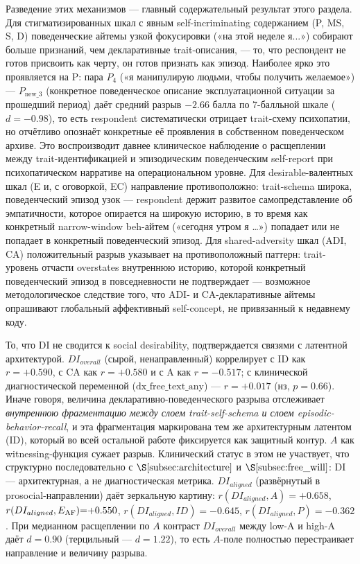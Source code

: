 Разведение этих механизмов --- главный содержательный результат этого раздела. Для стигматизированных шкал с явным self-incriminating содержанием (P, MS, S, D) поведенческие айтемы узкой фокусировки («на этой неделе я...») собирают больше признаний, чем декларативные trait-описания, --- то, что респондент не готов присвоить как черту, он готов признать как эпизод. Наиболее ярко это проявляется на P: пара $P_4$ («я манипулирую людьми, чтобы получить желаемое») --- $P_{\text{new\_3}}$ (конкретное поведенческое описание эксплуатационной ситуации за прошедший период) даёт средний разрыв $-2.66$ балла по 7-балльной шкале ($d{=}{-}0.98$), то есть respondent систематически отрицает trait-схему психопатии, но отчётливо опознаёт конкретные её проявления в собственном поведенческом архиве. Это воспроизводит давнее клиническое наблюдение о расщеплении между trait-идентификацией и эпизодическим поведенческим self-report при психопатическом нарративе \citep{hare2003, lilienfeld1990} на операциональном уровне. Для desirable-валентных шкал (E и, с оговоркой, EC) направление противоположно: trait-schema широка, поведенческий эпизод узок --- respondent держит развитое самопредставление об эмпатичности, которое опирается на широкую историю, в то время как конкретный narrow-window beh-айтем («сегодня утром я \ldots») попадает или не попадает в конкретный поведенческий эпизод. Для shared-adversity шкал (ADI, CA) положительный разрыв указывает на противоположный паттерн: trait-уровень отчасти overstates внутреннюю историю, которой конкретный поведенческий эпизод в повседневности не подтверждает --- возможное методологическое следствие того, что ADI- и CA-декларативные айтемы опрашивают глобальный аффективный self-concept, не привязанный к недавнему коду.

То, что DI не сводится к social desirability, подтверждается связями с латентной архитектурой. $DI_{overall}$ (сырой, ненаправленный) коррелирует с ID как $r{=}{+}0.590$, с CA как $r{=}{+}0.580$ и с A как $r{=}{-}0.517$; с клинической диагностической переменной ($\text{dx\_free\_text\_any}$) --- $r{=}{+}0.017$ (нз, $p{=}0.66$). Иначе говоря, величина декларативно-поведенческого разрыва отслеживает \emph{внутреннюю фрагментацию между слоем trait-self-schema и слоем episodic-behavior-recall}, и эта фрагментация маркирована тем же архитектурным латентом (ID), который во всей остальной работе фиксируется как защитный контур. $A$ как witnessing-функция сужает разрыв. Клинический статус в этом не участвует, что структурно последовательно с $\S\ref{subsec:architecture}$ и $\S\ref{subsec:free_will}$: DI --- архитектурная, а не диагностическая метрика. $DI_{aligned}$ (развёрнутый в prosocial-направлении) даёт зеркальную картину: $r(DI_{aligned}, A){=}{+}0.658$, $r(DI_{aligned}, E_{\mathrm{AF}}{}){=}{+}0.550$, $r(DI_{aligned}, ID){=}{-}0.645$, $r(DI_{aligned}, P){=}{-}0.362$. При медианном расщеплении по $A$ контраст $DI_{overall}$ между low-A и high-A даёт $d{=}0.90$ (терцильный --- $d{=}1.22$), то есть $A$-поле полностью перестраивает направление и величину разрыва.

